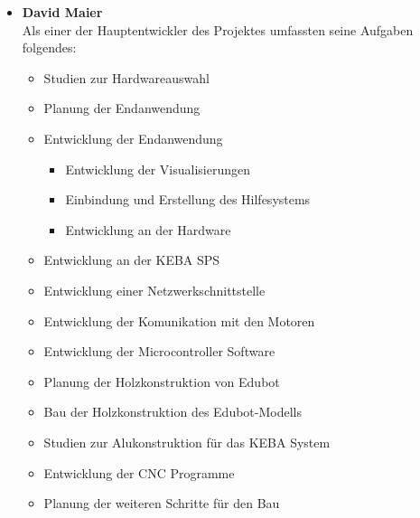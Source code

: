 \begin{itemize}
\item \textbf{David Maier}\\
Als einer der Hauptentwickler des Projektes umfassten seine Aufgaben folgendes:
\begin{itemize}
\item Studien zur Hardwareauswahl
\item Planung der Endanwendung
\item Entwicklung der Endanwendung
\begin{itemize}
\item Entwicklung der Visualisierungen
\item Einbindung und Erstellung des Hilfesystems
\end{itemize}
\begin{itemize}
\item Entwicklung an der Hardware
\end{itemize}
\item Entwicklung an der KEBA SPS
\item Entwicklung einer Netzwerkschnittstelle 
\item Entwicklung der Komunikation mit den Motoren
\item Entwicklung der Microcontroller Software
\item Planung der Holzkonstruktion von Edubot
\item Bau der Holzkonstruktion des Edubot-Modells
\item Studien zur Alukonstruktion für das KEBA System
\item Entwicklung der CNC Programme
\item Planung der weiteren Schritte für den Bau
\end{itemize}
\end{itemize}

